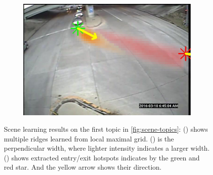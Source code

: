 \begin{figure}
\begin{subfigure}{0.32\linewidth}
        \includegraphics[width=\linewidth]{./img/scene_learning/res/middle/middle-1.jpg}
        \subcaption{}
        \label{subfig:scene-entry-exit}
    \end{subfigure}%
    \caption{Scene learning results on the first topic in \ref{fig:scene-topics}: () shows multiple ridges learned from local maximal grid. () is the perpendicular width, where lighter intensity indicates a larger width. () shows extracted entry/exit hotspots indicates by the green and red star. And the yellow arrow shows their direction.}
    \label{fig:scene-ridge-res}
\end{figure}